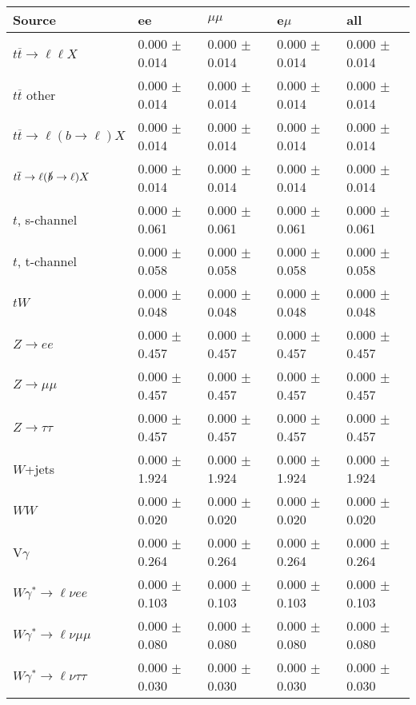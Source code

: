 \begin{tabular}{l | l l l l}
\hline\hline
 Source  &  ee  &  $\mu\mu$  &  e$\mu$  &  all \\
\hline
$t\overline{t}\rightarrow \ell\ell X$ &  0.000 $\pm$  0.014 &  0.000 $\pm$  0.014 &  0.000 $\pm$  0.014 &  0.000 $\pm$  0.014\\
$t\overline{t}$ other &  0.000 $\pm$  0.014 &  0.000 $\pm$  0.014 &  0.000 $\pm$  0.014 &  0.000 $\pm$  0.014\\
$t\overline{t}\rightarrow \ell(b\rightarrow \ell)X$ &  0.000 $\pm$  0.014 &  0.000 $\pm$  0.014 &  0.000 $\pm$  0.014 &  0.000 $\pm$  0.014\\
$t\overline{t}\rightarrow \ell(\slashed{b}\rightarrow \ell)X$ &  0.000 $\pm$  0.014 &  0.000 $\pm$  0.014 &  0.000 $\pm$  0.014 &  0.000 $\pm$  0.014\\
\hline
$t$, s-channel &  0.000 $\pm$  0.061 &  0.000 $\pm$  0.061 &  0.000 $\pm$  0.061 &  0.000 $\pm$  0.061\\
$t$, t-channel &  0.000 $\pm$  0.058 &  0.000 $\pm$  0.058 &  0.000 $\pm$  0.058 &  0.000 $\pm$  0.058\\
$tW$ &  0.000 $\pm$  0.048 &  0.000 $\pm$  0.048 &  0.000 $\pm$  0.048 &  0.000 $\pm$  0.048\\
\hline
$Z\rightarrow ee$ &  0.000 $\pm$  0.457 &  0.000 $\pm$  0.457 &  0.000 $\pm$  0.457 &  0.000 $\pm$  0.457\\
$Z\rightarrow\mu\mu$ &  0.000 $\pm$  0.457 &  0.000 $\pm$  0.457 &  0.000 $\pm$  0.457 &  0.000 $\pm$  0.457\\
$Z\rightarrow\tau\tau$ &  0.000 $\pm$  0.457 &  0.000 $\pm$  0.457 &  0.000 $\pm$  0.457 &  0.000 $\pm$  0.457\\
$W$+jets &  0.000 $\pm$  1.924 &  0.000 $\pm$  1.924 &  0.000 $\pm$  1.924 &  0.000 $\pm$  1.924\\
$WW$ &  0.000 $\pm$  0.020 &  0.000 $\pm$  0.020 &  0.000 $\pm$  0.020 &  0.000 $\pm$  0.020\\
\hline
V$\gamma$ &  0.000 $\pm$  0.264 &  0.000 $\pm$  0.264 &  0.000 $\pm$  0.264 &  0.000 $\pm$  0.264\\
$W\gamma^{*}\rightarrow\ell\nu e e$ &  0.000 $\pm$  0.103 &  0.000 $\pm$  0.103 &  0.000 $\pm$  0.103 &  0.000 $\pm$  0.103\\
$W\gamma^{*}\rightarrow\ell\nu\mu\mu$ &  0.000 $\pm$  0.080 &  0.000 $\pm$  0.080 &  0.000 $\pm$  0.080 &  0.000 $\pm$  0.080\\
$W\gamma^{*}\rightarrow\ell\nu\tau\tau$ &  0.000 $\pm$  0.030 &  0.000 $\pm$  0.030 &  0.000 $\pm$  0.030 &  0.000 $\pm$  0.030\\

\end{tabular}
